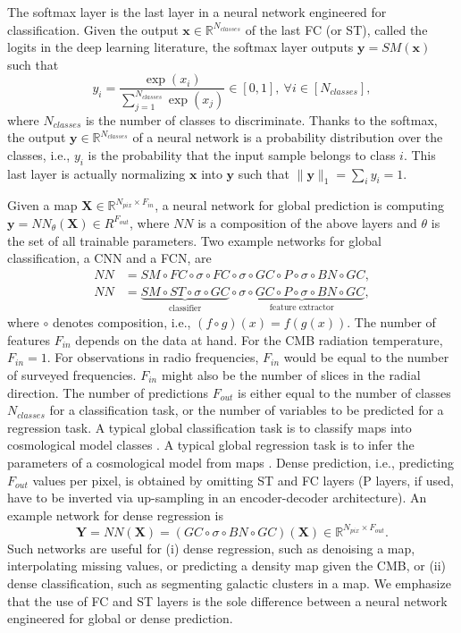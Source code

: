 \documentclass[final,twocolumn,3p,times,authoryear]{elsarticle}
\newcommand{\todo}[1]{{\color[rgb]{.6,.1,.6}{#1}}}
\renewcommand{\b}[1]{{\bm{#1}}}   %
\newcommand{\1}{\b{1}}              %
\newcommand{\0}{\b{0}}              %
\newcommand{\x}{\b{x}}
\newcommand{\X}{\b{X}}
\newcommand{\y}{\b{y}}
\newcommand{\Y}{\b{Y}}
\newcommand{\R}{\mathbb{R}}
\begin{document}
The softmax layer is the last layer in a neural network engineered for classification. Given the output $\x \in \R^{N_{classes}}$ of the last FC (or ST), called the logits in the deep learning literature, the softmax layer outputs $\y = SM(\x)$ such that
\begin{equation*}
	y_i = \frac{\exp(x_i)}{\sum_{j=1}^{N_{classes}} \exp(x_j)} \in [0, 1], \ \forall i \in [N_{classes}],
\end{equation*}
where $N_{classes}$ is the number of classes to discriminate. Thanks to the softmax, the output $\y \in \R^{N_{classes}}$ of a neural network is a probability distribution over the classes, i.e., $y_i$ is the probability that the input sample belongs to class $i$. This last layer is actually normalizing $\x$ into $\y$ such that $\| \y \|_1 = \sum_i y_i = 1$.

Given a map $\X \in \R^{N_{pix} \times F_{in}}$, a neural network for global prediction is computing $\y = NN_\theta(\X) \in R^{F_{out}}$, where $NN$ is a composition of the above layers and $\theta$ is the set of all trainable parameters.
Two example networks for global classification, a CNN and a FCN, are
\begin{align*}
	NN &= SM \circ FC \circ \sigma \circ FC \circ \sigma \circ GC \circ P \circ \sigma \circ BN \circ GC, \\
	NN &= \underbrace{SM \circ ST \circ \sigma \circ GC}_{\text{classifier}} \circ \underbrace{\sigma \circ GC \circ P \circ \sigma \circ BN \circ GC}_{\text{feature extractor}},
\end{align*}
where $\circ$ denotes composition, i.e., $(f \circ g)(x) = f(g(x))$.
The number of features $F_{in}$ depends on the data at hand. For the CMB radiation temperature, $F_{in} = 1$. For observations in radio frequencies, $F_{in}$ would be equal to the number of surveyed frequencies. $F_{in}$ might also be the number of slices in the radial direction. The number of predictions $F_{out}$ is either equal to the number of classes $N_{classes}$ for a classification task, or the number of variables to be predicted for a regression task. A typical global classification task is to classify maps into cosmological model classes \citep{schmelze2017cosmologicalmodel}. A typical global regression task is to infer the parameters of a cosmological model  from maps \citep{fluri2018deep,gupta2018nongaussianinformation}.
Dense prediction, i.e., predicting $F_{out}$ values per pixel, is obtained by omitting ST and FC layers (P layers, if used, have to be inverted via up-sampling in an encoder-decoder architecture). An example network for dense regression is
\begin{equation*}
	\Y = NN(\X) = (GC \circ \sigma \circ BN \circ GC)(\X) \in \R^{N_{pix} \times F_{out}}.
\end{equation*}
Such networks are useful for (i) dense regression, such as denoising a map, interpolating missing values, or predicting a density map given the CMB, or (ii) dense classification, such as segmenting galactic clusters in a \todo{xx} map. \todo{TK: please find better cosmological applications. Maybe some refs?} We emphasize that the use of FC and ST layers is the sole difference between a neural network engineered for global or dense prediction.
\end{document}
